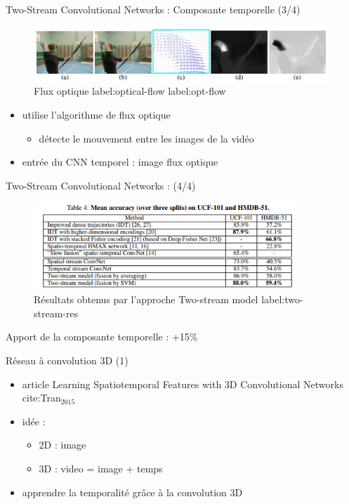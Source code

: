 \documentclass[presentation]{beamer}
\begin{document}
\begin{frame}[label={sec:org519057d}]{Two-Stream Convolutional Networks : Composante temporelle (3/4)}
\begin{figure}[htbp]
\centering
\includegraphics[width=12cm]{optical_flow_slide.jpg}
\caption{Flux optique label:optical-flow label:opt-flow}
\end{figure}
\begin{itemize}
\item utilise l'algorithme de flux optique
\begin{itemize}
\item détecte le mouvement entre les images de la vidéo
\end{itemize}
\item entrée du CNN temporel : image flux optique
\end{itemize}
\end{frame}

\begin{frame}[label={sec:org5561717}]{Two-Stream Convolutional Networks : (4/4)}
\begin{figure}[htbp]
\centering
\includegraphics[width=10cm]{two_stream_res.png}
\caption{Résultats obtenus par l'approche Two-stream model label:two-stream-res}
\end{figure}

Apport de la composante temporelle : +15\%
\end{frame}

\begin{frame}[label={sec:org01d863f}]{Réseau à convolution 3D (1)}
\begin{itemize}
\item article Learning Spatiotemporal Features with 3D Convolutional Networks cite:Tran\(_{\text{2015}}\)
\item idée :
\begin{itemize}
\item 2D : image
\item 3D : video = image + temps
\end{itemize}
\item apprendre la temporalité grâce à la convolution 3D
\end{itemize}
\end{frame}
\end{document}

